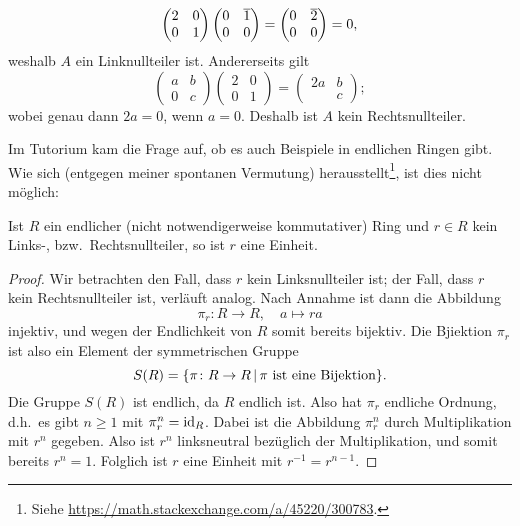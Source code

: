 \begin{itemize}
\[\begin{pmatrix}
          2 & 0 \\
          0 & 1
        \end{pmatrix}
        \begin{pmatrix}
          0 & \overline{1} \\
          0 & 0
        \end{pmatrix}
      = \begin{pmatrix}
          0 & \overline{2} \\
          0 & 0
        \end{pmatrix}
      = 0,
    \]
    weshalb $A$ ein Linknullteiler ist.
    Andererseits gilt
    \[
        \begin{pmatrix}
          a & b \\
          0 & c
        \end{pmatrix}
        \begin{pmatrix}
          2 & 0 \\
          0 & 1
        \end{pmatrix}
      = \begin{pmatrix}
          2a  & b \\
              & c
        \end{pmatrix};
    \]
    wobei genau dann $2a = 0$, wenn $a = 0$.
    Deshalb ist $A$ kein Rechtsnullteiler.
\end{itemize}    

Im Tutorium kam die Frage auf, ob es auch Beispiele in endlichen Ringen gibt.
Wie sich (entgegen meiner spontanen Vermutung) herausstellt\footnote{Siehe \url{https://math.stackexchange.com/a/45220/300783}.}, ist dies nicht möglich:

\begin{lemma}
  \label{lemma: non zero divisors are units}
  Ist $R$ ein endlicher \textup(nicht notwendigerweise kommutativer\textup) Ring und $r \in R$ kein Links-, bzw.\ Rechtsnullteiler, so ist $r$ eine Einheit.
\end{lemma}

\begin{proof}
  Wir betrachten den Fall, dass $r$ kein Linksnullteiler ist;
  der Fall, dass $r$ kein Rechtsnullteiler ist, verläuft analog.
  Nach Annahme ist dann die Abbildung
  \[
            \pi_r
    \colon  R
    \to     R,
    \quad   a
    \mapsto ra
  \]
  injektiv, und wegen der Endlichkeit von $R$ somit bereits bijektiv.
  Die Bjiektion $\pi_r$ ist also ein Element der symmetrischen Gruppe
  \[
      S(R)
    = \{
        \pi \colon R \to R
      \suchthat
      \text{$\pi$ ist eine Bijektion}
      \}.
  \]
  Die Gruppe $S(R)$ ist endlich, da $R$ endlich ist.
  Also hat $\pi_r$ endliche Ordnung, d.h.\ es gibt $n \geq 1$ mit $\pi_r^n = \operatorname{id}_R$.
  Dabei ist die Abbildung $\pi_r^n$ durch Multiplikation mit $r^n$ gegeben.
  Also ist $r^n$ linksneutral bezüglich der Multiplikation, und somit bereits $r^n = 1$.
  Folglich ist $r$ eine Einheit mit $r^{-1} = r^{n-1}$.
\end{proof}

